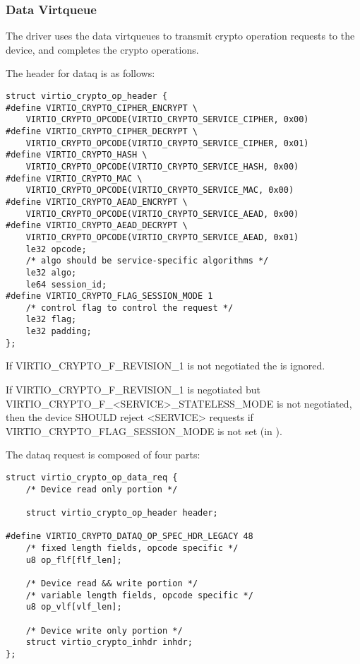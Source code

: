 \subsubsection{Data Virtqueue}\label{sec:Device Types / Crypto Device / Device Operation / Data Virtqueue}

The driver uses the data virtqueues to transmit crypto operation requests to the device,
and completes the crypto operations.

The header for dataq is as follows:

\begin{lstlisting}
struct virtio_crypto_op_header {
#define VIRTIO_CRYPTO_CIPHER_ENCRYPT \
    VIRTIO_CRYPTO_OPCODE(VIRTIO_CRYPTO_SERVICE_CIPHER, 0x00)
#define VIRTIO_CRYPTO_CIPHER_DECRYPT \
    VIRTIO_CRYPTO_OPCODE(VIRTIO_CRYPTO_SERVICE_CIPHER, 0x01)
#define VIRTIO_CRYPTO_HASH \
    VIRTIO_CRYPTO_OPCODE(VIRTIO_CRYPTO_SERVICE_HASH, 0x00)
#define VIRTIO_CRYPTO_MAC \
    VIRTIO_CRYPTO_OPCODE(VIRTIO_CRYPTO_SERVICE_MAC, 0x00)
#define VIRTIO_CRYPTO_AEAD_ENCRYPT \
    VIRTIO_CRYPTO_OPCODE(VIRTIO_CRYPTO_SERVICE_AEAD, 0x00)
#define VIRTIO_CRYPTO_AEAD_DECRYPT \
    VIRTIO_CRYPTO_OPCODE(VIRTIO_CRYPTO_SERVICE_AEAD, 0x01)
    le32 opcode;
    /* algo should be service-specific algorithms */
    le32 algo;
    le64 session_id;
#define VIRTIO_CRYPTO_FLAG_SESSION_MODE 1
    /* control flag to control the request */
    le32 flag;
    le32 padding;
};
\end{lstlisting}

\begin{note}
If VIRTIO_CRYPTO_F_REVISION_1 is not negotiated the  is ignored.

If VIRTIO_CRYPTO_F_REVISION_1 is negotiated but VIRTIO_CRYPTO_F_<SERVICE>_STATELESS_MODE
is not negotiated, then the device SHOULD reject <SERVICE> requests if
VIRTIO_CRYPTO_FLAG_SESSION_MODE is not set (in ).
\end{note}

The dataq request is composed of four parts:
\begin{lstlisting}
struct virtio_crypto_op_data_req {
    /* Device read only portion */

    struct virtio_crypto_op_header header;

#define VIRTIO_CRYPTO_DATAQ_OP_SPEC_HDR_LEGACY 48
    /* fixed length fields, opcode specific */
    u8 op_flf[flf_len];

    /* Device read && write portion */
    /* variable length fields, opcode specific */
    u8 op_vlf[vlf_len];

    /* Device write only portion */
    struct virtio_crypto_inhdr inhdr;
};
\end{lstlisting}

